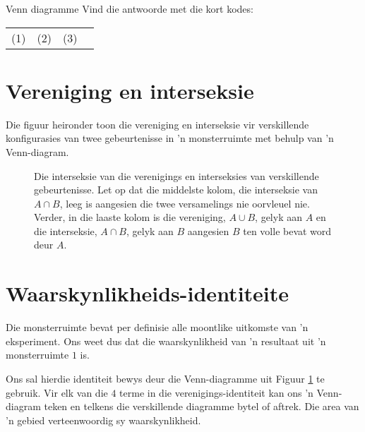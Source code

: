 \begin{exercises}{Venn diagramme}
  Vind die antwoorde met die kort kodes: \\
  \begin{tabularx}{\textwidth}{XXXX}
    (1) & (2) & (3) \\
  \end{tabularx}
\end{exercises}

\section{Vereniging en interseksie}


Die figuur heironder toon die vereniging en interseksie vir verskillende konfigurasies van twee gebeurtenisse in 'n monsterruimte met behulp van 'n Venn-diagram.

\begin{figure}[h]
  
  \caption{Die interseksie van die verenigings en interseksies van verskillende gebeurtenisse. Let op dat die middelste kolom, die interseksie van $A \cap B$, leeg is aangesien die twee versamelings nie oorvleuel nie. Verder, in die laaste kolom is die vereniging, $A \cup B$, gelyk aan $A$ en die interseksie, $A \cap B$, gelyk aan $B$ aangesien $B$ ten volle bevat word deur $A$.}
  \label{fig:venn_union_intersection}
\end{figure}


\section{Waarskynlikheids-identiteite}

Die monsterruimte bevat per definisie alle moontlike uitkomste van 'n eksperiment. Ons weet dus dat die waarskynlikheid van 'n resultaat uit 'n monsterruimte $1$ is.


Ons sal hierdie identiteit bewys deur die Venn-diagramme uit Figuur \ref{fig:venn_union_intersection} te gebruik. Vir elk van die $4$ terme in die verenigings-identiteit kan ons 'n Venn-diagram teken en telkens die verskillende diagramme bytel of aftrek. Die area van 'n gebied verteenwoordig sy waarskynlikheid.


